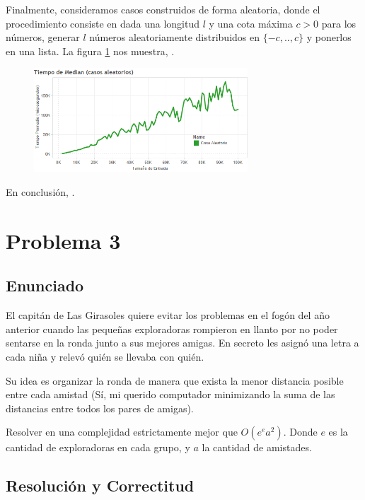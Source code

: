 \documentclass{article}
\theoremstyle{definition}
\theoremstyle{remark}
\begin{document}
Finalmente, consideramos casos construidos de forma aleatoria, donde el procedimiento consiste en dada una longitud $l$ y una cota máxima $c > 0$ para los números, generar $l$ números aleatoriamente distribuidos en $\{-c, .., c\}$ y ponerlos en una lista. La figura \ref{grf:ex2-random} nos muestra, .

\begin{figure}[h!]
\centering
\label{grf:ex2-random}
\includegraphics[width=8cm]{images/ex2-random}
\caption{}
\end{figure}


En conclusión, .

\section{Problema 3}

\subsection{Enunciado}

El capitán de Las Girasoles quiere evitar los problemas en el fogón del año anterior cuando las pequeñas exploradoras rompieron en llanto por no poder sentarse en la ronda junto a sus mejores amigas. En secreto les asignó una letra a cada niña y relevó quién se llevaba con quién.

Su idea es organizar la ronda de manera que exista la menor distancia posible entre cada amistad (Sí, mi querido computador minimizando la suma de las distancias entre todos los pares de amigas).

Resolver en una complejidad estrictamente mejor que $O(e^e a^2)$. Donde $e$ es la cantidad de exploradoras en cada grupo, y $a$ la cantidad de amistades.

\subsection{Resolución y Correctitud}
\end{document}
